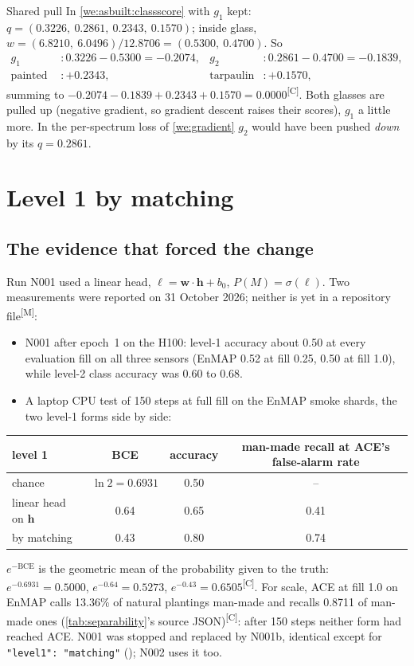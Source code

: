\documentclass[11pt,a4paper,oneside,openany]{book}
\newcommand{\B}[1]{{\symbf{#1}}}
\newcommand{\B}[1]{{\bm{#1}}}
\newcommand{\meas}{\textsuperscript{\textsf{\scriptsize[M]}}}
\newcommand{\comp}{\textsuperscript{\textsf{\scriptsize[C]}}}
\newcommand{\vw}{\B{w}}
\newcommand{\vh}{\B{h}}
\begin{document}
\begin{worked}[label=we:asbuilt:gradient]{Shared pull}
In \cref{we:asbuilt:classscore} with $g_1$ kept: $q=(0.3226,\ 0.2861,\ 0.2343,\ 0.1570)$; inside glass, $w=(6.8210,\ 6.0496)/12.8706=(0.5300,\ 0.4700)$. So
\begin{align*}
g_1 &: 0.3226-0.5300=-0.2074, & g_2 &: 0.2861-0.4700=-0.1839,\\
\text{painted metal} &: +0.2343, & \text{tarpaulin} &: +0.1570,
\end{align*}
summing to $-0.2074-0.1839+0.2343+0.1570=0.0000$\comp. Both glasses are pulled up (negative gradient, so gradient descent raises their scores), $g_1$ a little more. In the
per-spectrum loss of \cref{we:gradient} $g_2$ would have been pushed \emph{down} by its $q=0.2861$.
\end{worked}

\section{Level 1 by matching}
\label{sec:asbuilt:level1}

\subsection{The evidence that forced the change}

Run N001 used a linear head, $\ell=\vw\cdot\vh+b_0$, $P(M)=\sigma(\ell)$. Two measurements were reported on 31 October 2026; neither is yet in a repository file\meas:
\begin{itemize}
\item N001 after epoch~1 on the H100: level-1 accuracy about 0.50 at every evaluation fill on all three sensors (EnMAP 0.52 at fill 0.25, 0.50 at fill 1.0), while level-2 class
accuracy was 0.60 to 0.68.
\item A laptop CPU test of 150 steps at full fill on the EnMAP smoke shards, the two level-1 forms side by side:
\end{itemize}
\begin{center}\small
\begin{tabular}{@{}lccc@{}}
\toprule
level 1 & BCE & accuracy & man-made recall at ACE's false-alarm rate\\
\midrule
chance & $\ln2=0.6931$ & 0.50 & --\\
linear head on $\vh$ & 0.64 & 0.65 & 0.41\\
by matching & 0.43 & 0.80 & 0.74\\
\bottomrule
\end{tabular}
\end{center}
$e^{-\mathrm{BCE}}$ is the geometric mean of the probability given to the truth: $e^{-0.6931}=0.5000$, $e^{-0.64}=0.5273$, $e^{-0.43}=0.6505$\comp. For scale, ACE at fill 1.0 on
EnMAP calls 13.36\% of natural plantings man-made and recalls 0.8711 of man-made ones (\cref{tab:separability}'s source JSON)\comp: after 150 steps neither form had reached
ACE. N001 was stopped and replaced by N001b, identical except for \texttt{"level1": "matching"} (); N002 uses it too.
\end{document}
